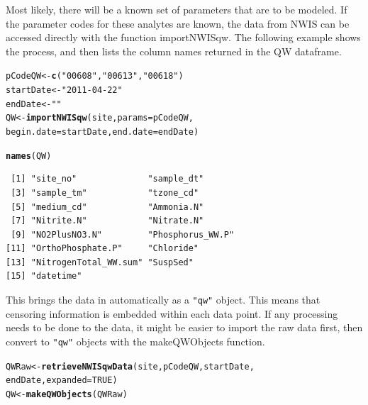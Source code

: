 \documentclass[a4paper,11pt]{article}\usepackage[]{graphicx}\usepackage[]{color}
\makeatletter
\newcommand{\hlnum}[1]{\textcolor[rgb]{0.686,0.059,0.569}{#1}}%
\newcommand{\hlstr}[1]{\textcolor[rgb]{0.192,0.494,0.8}{#1}}%
\newcommand{\hlstd}[1]{\textcolor[rgb]{0.345,0.345,0.345}{#1}}%
\newcommand{\hlkwb}[1]{\textcolor[rgb]{0.69,0.353,0.396}{#1}}%
\newcommand{\hlkwc}[1]{\textcolor[rgb]{0.333,0.667,0.333}{#1}}%
\newcommand{\hlkwd}[1]{\textcolor[rgb]{0.737,0.353,0.396}{\textbf{#1}}}%
\newenvironment{kframe}{%
 \def\at@end@of@kframe{}%
 \ifinner\ifhmode%
  \def\at@end@of@kframe{\end{minipage}}%
  \begin{minipage}{\columnwidth}%
 \fi\fi%
 \def\FrameCommand##1{\hskip\@totalleftmargin \hskip-\fboxsep
 \colorbox{shadecolor}{##1}\hskip-\fboxsep
     \hskip-\linewidth \hskip-\@totalleftmargin \hskip\columnwidth}%
 \MakeFramed {\advance\hsize-\width
   \@totalleftmargin\z@ \linewidth\hsize
   \@setminipage}}%
 {\par\unskip\endMakeFramed%
 \at@end@of@kframe}
\newenvironment{knitrout}{}{} %
\makeatother
\begin{document}
Most likely, there will be a known set of parameters that are to be modeled. If the parameter codes for these analytes are known, the data from NWIS can be accessed directly with the function importNWISqw. The following example shows the process, and then lists the column names returned in the QW dataframe.


\begin{knitrout}
\color{fgcolor}\begin{kframe}
\begin{alltt}
\hlstd{pCodeQW} \hlkwb{<-} \hlkwd{c}\hlstd{(}\hlstr{"00608"}\hlstd{,}\hlstr{"00613"}\hlstd{,}\hlstr{"00618"}\hlstd{)}
\hlstd{startDate} \hlkwb{<-} \hlstr{"2011-04-22"}
\hlstd{endDate} \hlkwb{<-} \hlstr{""}
\hlstd{QW} \hlkwb{<-} \hlkwd{importNWISqw}\hlstd{(site,} \hlkwc{params}\hlstd{=pCodeQW,}
                   \hlkwc{begin.date}\hlstd{=startDate,} \hlkwc{end.date}\hlstd{=endDate)}
\end{alltt}
\end{kframe}
\end{knitrout}



\begin{knitrout}
\color{fgcolor}\begin{kframe}
\begin{alltt}
\hlkwd{names}\hlstd{(QW)}
\end{alltt}
\begin{verbatim}
 [1] "site_no"              "sample_dt"           
 [3] "sample_tm"            "tzone_cd"            
 [5] "medium_cd"            "Ammonia.N"           
 [7] "Nitrite.N"            "Nitrate.N"           
 [9] "NO2PlusNO3.N"         "Phosphorus_WW.P"     
[11] "OrthoPhosphate.P"     "Chloride"            
[13] "NitrogenTotal_WW.sum" "SuspSed"             
[15] "datetime"            
\end{verbatim}
\end{kframe}
\end{knitrout}


This brings the data in automatically as a \texttt{"qw"} object. This means that censoring information is embedded within each data point. If any processing needs to be done to the data, it might be easier to import the raw data first, then convert to \texttt{"qw"} objects with the makeQWObjects function.

\begin{knitrout}
\color{fgcolor}\begin{kframe}
\begin{alltt}
\hlstd{QWRaw} \hlkwb{<-} \hlkwd{retrieveNWISqwData}\hlstd{(site,pCodeQW,startDate,}
                            \hlstd{endDate,}\hlkwc{expanded}\hlstd{=}\hlnum{TRUE}\hlstd{)}
\hlstd{QW} \hlkwb{<-} \hlkwd{makeQWObjects}\hlstd{(QWRaw)}
\end{alltt}
\end{kframe}
\end{knitrout}
\end{document}
